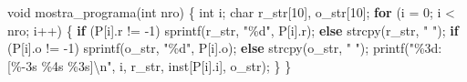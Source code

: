 \documentclass[
  brazilian,
  letterpaper,
]{book}
\newenvironment{Shaded}{\begin{snugshade}}{\end{snugshade}}
\newcommand{\ControlFlowTok}[1]{\textcolor[rgb]{0.00,0.23,0.31}{\textbf{#1}}}
\newcommand{\DataTypeTok}[1]{\textcolor[rgb]{0.68,0.00,0.00}{#1}}
\newcommand{\DecValTok}[1]{\textcolor[rgb]{0.68,0.00,0.00}{#1}}
\newcommand{\NormalTok}[1]{\textcolor[rgb]{0.00,0.23,0.31}{#1}}
\newcommand{\OperatorTok}[1]{\textcolor[rgb]{0.37,0.37,0.37}{#1}}
\newcommand{\SpecialCharTok}[1]{\textcolor[rgb]{0.37,0.37,0.37}{#1}}
\newcommand{\StringTok}[1]{\textcolor[rgb]{0.13,0.47,0.30}{#1}}
\theoremstyle{plain}
\theoremstyle{definition}
\theoremstyle{remark}
\begin{document}
\begin{Shaded}
\begin{Highlighting}[]
\DataTypeTok{void}\NormalTok{ mostra\_programa}\OperatorTok{(}\DataTypeTok{int}\NormalTok{ nro}\OperatorTok{)}
\OperatorTok{\{}
    \DataTypeTok{int}\NormalTok{ i}\OperatorTok{;}
    \DataTypeTok{char}\NormalTok{ r\_str}\OperatorTok{[}\DecValTok{10}\OperatorTok{],}\NormalTok{ o\_str}\OperatorTok{[}\DecValTok{10}\OperatorTok{];}
    \ControlFlowTok{for} \OperatorTok{(}\NormalTok{i }\OperatorTok{=} \DecValTok{0}\OperatorTok{;}\NormalTok{ i }\OperatorTok{\textless{}}\NormalTok{ nro}\OperatorTok{;}\NormalTok{ i}\OperatorTok{++)}
    \OperatorTok{\{}
        \ControlFlowTok{if} \OperatorTok{(}\NormalTok{P}\OperatorTok{[}\NormalTok{i}\OperatorTok{].}\NormalTok{r }\OperatorTok{!=} \OperatorTok{{-}}\DecValTok{1}\OperatorTok{)}
\NormalTok{            sprintf}\OperatorTok{(}\NormalTok{r\_str}\OperatorTok{,} \StringTok{"}\SpecialCharTok{\%d}\StringTok{"}\OperatorTok{,}\NormalTok{ P}\OperatorTok{[}\NormalTok{i}\OperatorTok{].}\NormalTok{r}\OperatorTok{);}
        \ControlFlowTok{else}
\NormalTok{            strcpy}\OperatorTok{(}\NormalTok{r\_str}\OperatorTok{,} \StringTok{"   "}\OperatorTok{);}
        \ControlFlowTok{if} \OperatorTok{(}\NormalTok{P}\OperatorTok{[}\NormalTok{i}\OperatorTok{].}\NormalTok{o }\OperatorTok{!=} \OperatorTok{{-}}\DecValTok{1}\OperatorTok{)}
\NormalTok{            sprintf}\OperatorTok{(}\NormalTok{o\_str}\OperatorTok{,} \StringTok{"}\SpecialCharTok{\%d}\StringTok{"}\OperatorTok{,}\NormalTok{ P}\OperatorTok{[}\NormalTok{i}\OperatorTok{].}\NormalTok{o}\OperatorTok{);}
        \ControlFlowTok{else}
\NormalTok{            strcpy}\OperatorTok{(}\NormalTok{o\_str}\OperatorTok{,} \StringTok{"   "}\OperatorTok{);}
\NormalTok{        printf}\OperatorTok{(}\StringTok{"}\SpecialCharTok{\%3d}\StringTok{:[}\SpecialCharTok{\%{-}3s}\StringTok{  }\SpecialCharTok{\%4s}\StringTok{  }\SpecialCharTok{\%3s}\StringTok{]}\SpecialCharTok{\textbackslash{}n}\StringTok{"}\OperatorTok{,}\NormalTok{ i}\OperatorTok{,}\NormalTok{ r\_str}\OperatorTok{,}\NormalTok{ inst}\OperatorTok{[}\NormalTok{P}\OperatorTok{[}\NormalTok{i}\OperatorTok{].}\NormalTok{i}\OperatorTok{],}\NormalTok{ o\_str}\OperatorTok{);}
    \OperatorTok{\}}
\OperatorTok{\}}


\end{Highlighting}
\end{Shaded}
\end{document}
